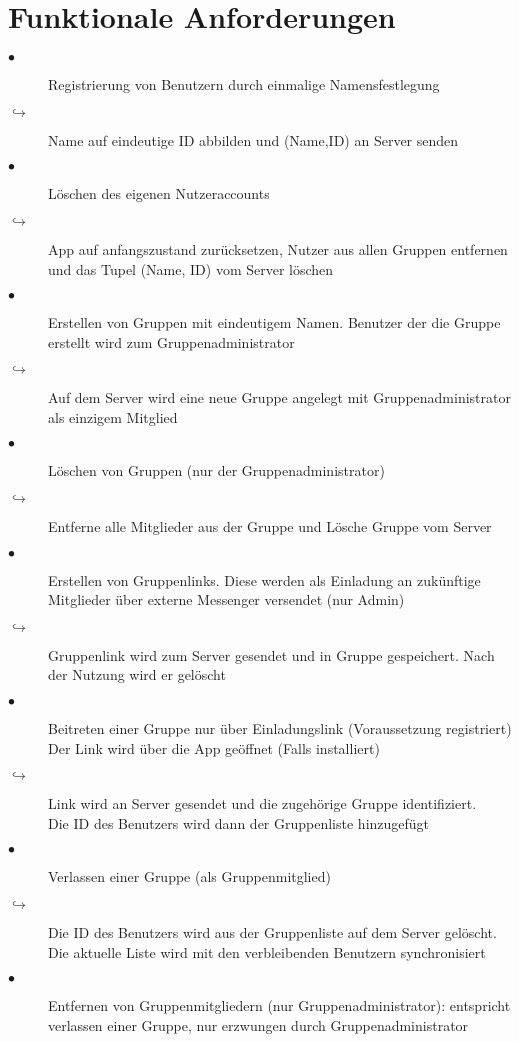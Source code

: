 \section{Funktionale Anforderungen}
\begin{description}
\item[$\bullet$] Registrierung von Benutzern durch einmalige Namensfestlegung
\item[$\hookrightarrow$] Name auf eindeutige ID abbilden und (Name,ID) an Server senden
\item[$\bullet$] Löschen des eigenen Nutzeraccounts
\item[$\hookrightarrow$] App auf anfangszustand zurücksetzen, Nutzer aus allen Gruppen entfernen und das Tupel (Name, ID) vom Server löschen
\item[$\bullet$] Erstellen von Gruppen mit eindeutigem Namen. Benutzer der die Gruppe erstellt wird zum Gruppenadministrator
\item[$\hookrightarrow$] Auf dem Server wird eine neue Gruppe angelegt mit Gruppenadministrator als einzigem Mitglied
\item[$\bullet$] Löschen von Gruppen (nur der Gruppenadministrator)
\item[$\hookrightarrow$] Entferne alle Mitglieder aus der Gruppe und Lösche Gruppe vom Server
\item[$\bullet$] Erstellen von Gruppenlinks. Diese werden als Einladung an zukünftige Mitglieder über externe Messenger versendet (nur Admin)
\item[$\hookrightarrow$] Gruppenlink wird zum Server gesendet und in Gruppe gespeichert. Nach der Nutzung wird er gelöscht
\item[$\bullet$] Beitreten einer Gruppe nur über Einladungslink (Voraussetzung registriert)
     Der Link wird über die App geöffnet (Falls installiert)
\item[$\hookrightarrow$] Link wird an Server gesendet und die zugehörige Gruppe identifiziert.\\ Die ID des Benutzers wird dann der Gruppenliste hinzugefügt
\item[$\bullet$] Verlassen einer Gruppe (als Gruppenmitglied)
\item[$\hookrightarrow$] Die ID des Benutzers wird aus der Gruppenliste auf dem Server gelöscht. Die aktuelle Liste wird mit den verbleibenden Benutzern synchronisiert
\item[$\bullet$] Entfernen von Gruppenmitgliedern (nur Gruppenadministrator): entspricht verlassen einer Gruppe, nur erzwungen durch Gruppenadministrator

\end{description}
